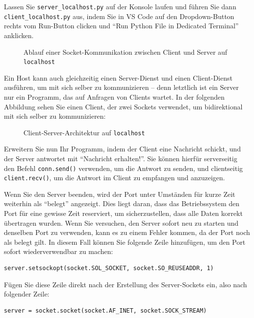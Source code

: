 \begin{myexercise}
    Lassen Sie \texttt{server\_localhost.py} auf der Konsole laufen und führen Sie dann \texttt{client\_localhost.py} aus, indem Sie in VS Code auf den Dropdown-Button rechts vom Run-Button clicken und \enquote{Run Python File in Dedicated Terminal} anklicken.
    \begin{figure}[H]
        \centering
        
        \caption{Ablauf einer Socket-Kommunikation zwischen Client und Server auf \texttt{localhost}}
    \end{figure}
    Ein Host kann auch gleichzeitig einen Server-Dienst und einen Client-Dienst ausführen, um mit sich selber zu kommunizieren -- denn letztlich ist ein Server nur ein Programm, das auf Anfragen von Clients wartet. In der folgenden Abbildung sehen Sie einen Client, der zwei Sockets verwendet, um bidirektional mit sich selber zu kommunizieren:
    \begin{figure}[H]
        \centering
        
        \caption{Client-Server-Architektur auf \texttt{localhost}}
    \end{figure}
\end{myexercise}

\begin{myexercise}
    Erweitern Sie nun Ihr Programm, indem der Client eine Nachricht schickt, und der Server antwortet mit \enquote{Nachricht erhalten!}. Sie können hierfür serverseitig den Befehl \lstinline|conn.send()| verwenden, um die Antwort zu senden, und clientseitig \lstinline|client.recv()|, um die Antwort im Client zu empfangen und anzuzeigen.
\end{myexercise}

\begin{myattention}
    Wenn Sie den Server beenden, wird der Port unter Umständen für kurze Zeit weiterhin als \enquote{belegt} angezeigt. Dies liegt daran, dass das Betriebssystem den Port für eine gewisse Zeit reserviert, um sicherzustellen, dass alle Daten korrekt übertragen wurden. Wenn Sie versuchen, den Server sofort neu zu starten und denselben Port zu verwenden, kann es zu einem Fehler kommen, da der Port noch als belegt gilt. In diesem Fall können Sie folgende Zeile hinzufügen, um den Port sofort wiederverwendbar zu machen:
    \begin{lstlisting}
server.setsockopt(socket.SOL_SOCKET, socket.SO_REUSEADDR, 1)
    \end{lstlisting}
    Fügen Sie diese Zeile direkt nach der Erstellung des Server-Sockets ein, also nach folgender Zeile:
    \begin{lstlisting}
server = socket.socket(socket.AF_INET, socket.SOCK_STREAM)
    \end{lstlisting}
\end{myattention}

